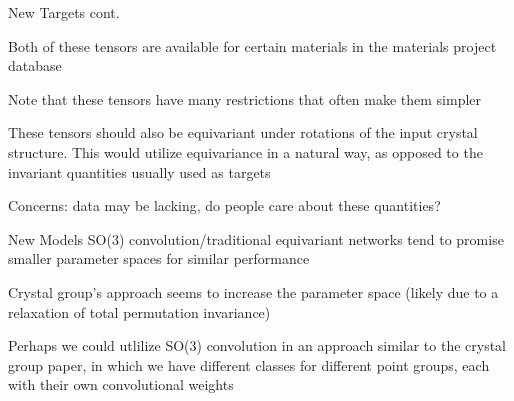 \documentclass[handout, 11pt]{beamer}
\begin{document}
\begin{frame}{New Targets cont.}

Both of these tensors are available for certain materials in the materials project database

\medskip

Note that these tensors have many restrictions that often make them simpler

\medskip\pause

These tensors should also be equivariant under rotations of the input crystal structure.
This would utilize equivariance in a natural way, as opposed to the invariant quantities usually used as targets

\vspace{.8cm}\pause

Concerns: data may be lacking, do people care about these quantities?
\end{frame}

\begin{frame}{New Models}
SO(3) convolution/traditional equivariant networks tend to promise smaller parameter spaces for similar performance

\medskip

Crystal group's approach seems to increase the parameter space (likely due to a relaxation of total permutation invariance)

\medskip

Perhaps we could utlilize SO(3) convolution in an approach similar to the crystal group paper, in which we have different classes for different point groups, each with their own convolutional weights


\end{frame}
\end{document}
